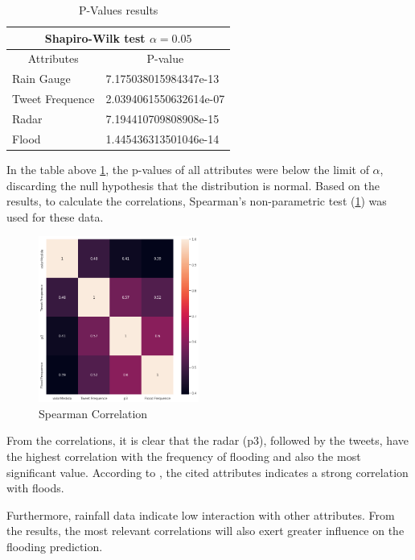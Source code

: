 \begin{table}[H]\label{shapiro}
	\caption{P-Values results}
	\begin{center}
	\begin{tabular}{ll}
		\hline
		\multicolumn{2}{c}{Shapiro-Wilk test $\alpha=0.05$}                              \\ \hline
		\multicolumn{1}{c|}{Attributes}      & \multicolumn{1}{c}{P-value} \\ \hline
		\multicolumn{1}{l|}{Rain Gauge}      & 7.175038015984347e-13       \\ \hline
		\multicolumn{1}{l|}{Tweet Frequence} & 2.0394061550632614e-07      \\ \hline
		\multicolumn{1}{l|}{Radar}           & 7.194410709808908e-15       \\ \hline
		\multicolumn{1}{l|}{Flood}           & 1.445436313501046e-14       \\ \hline
	\end{tabular}
\end{center}
\end{table}

In the table above \ref{shapiro}, the p-values of all attributes were below the limit of $\alpha$, discarding the null hypothesis that the distribution is normal. Based on the results, to calculate the correlations, Spearman's non-parametric test (\ref{fig:corr}) was used for these data. 

\begin{figure}[H]
	\centering
	\includegraphics[width=0.47\textwidth]{figs/corr.png}
	\caption{Spearman Correlation}
	\label{fig:corr}
\end{figure}

From the correlations, it is clear that the radar (p3), followed by the tweets, have the highest correlation with the frequency of flooding and also the most significant value. According to , the cited attributes indicates a strong correlation with floods. 

Furthermore, rainfall data indicate low interaction with other attributes. From the results, the most relevant correlations will also exert greater influence on the flooding prediction.
